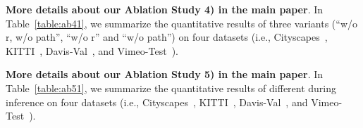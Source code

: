 \documentclass[10pt,twocolumn,letterpaper]{article}
\begin{document}
\noindent
\textbf{More details about our Ablation Study 4) in the main paper}.
In Table~\ref{table:ab41}, we summarize the quantitative results of three variants (``w/o r, w/o path'', ``w/o r'' and ``w/o path'') on four datasets (i.e., Cityscapes~\cite{cityscapes}, KITTI~\cite{kitti}, Davis-Val~\cite{davis}, and Vimeo-Test~\cite{vimeo}).
\begin{table*}[th]
\caption{\textbf{Spatial path is effective in DMVFN}. The evaluation metric is MS-SSIM ().}

\centering
{}
\label{table:ab41}
\end{table*}

\noindent
\textbf{More details about our Ablation Study 5) in the main paper}.
In Table~\ref{table:ab51}, we summarize the quantitative results of different  during inference on four datasets (i.e., Cityscapes~\cite{cityscapes}, KITTI~\cite{kitti}, Davis-Val~\cite{davis}, and Vimeo-Test~\cite{vimeo}).
\end{document}
